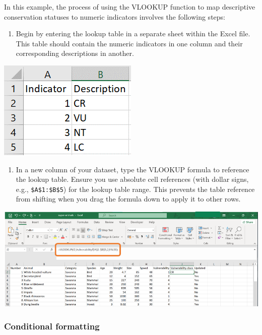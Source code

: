 \documentclass[
]{book}
\providecommand{\tightlist}{%
  \setlength{\itemsep}{0pt}\setlength{\parskip}{0pt}}
\begin{document}
In this example, the process of using the VLOOKUP function to map descriptive conservation statuses to numeric indicators involves the following steps:

\begin{enumerate}
\def\labelenumi{\arabic{enumi}.}
\tightlist
\item
  Begin by entering the lookup table in a separate sheet within the Excel file. This table should contain the numeric indicators in one column and their corresponding descriptions in another.
\end{enumerate}

\begin{center}\includegraphics[width=0.3\linewidth]{Figures/manipulation_1_lookup} \end{center}

\begin{enumerate}
\def\labelenumi{\arabic{enumi}.}
\setcounter{enumi}{1}
\tightlist
\item
  In a new column of your dataset, type the VLOOKUP formula to reference the lookup table. Ensure you use absolute cell references (with dollar signs, e.g., \texttt{\$A\$1:\$B\$5}) for the lookup table range. This prevents the table reference from shifting when you drag the formula down to apply it to other rows.
\end{enumerate}

\begin{center}\includegraphics[width=0.7\linewidth]{Figures/manipulation_1_formula} \end{center}

\subsubsection*{Conditional formatting}\label{conditional-formatting}
\end{document}
